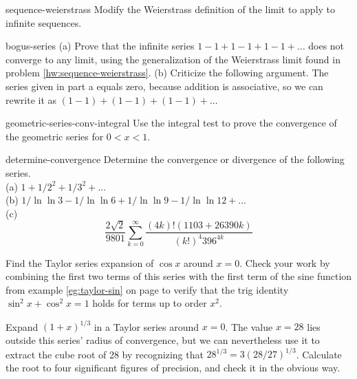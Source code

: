 \begin{hwsection}
\begin{hwwithsoln}{sequence-weierstrass}
Modify the Weierstrass definition of the limit to apply to infinite sequences.
\end{hwwithsoln}

\begin{hwwithsoln}{bogus-series}
(a) Prove that the infinite series $1-1+1-1+1-1+\ldots$ does not converge to any limit, using the generalization
of the Weierstrass limit found in problem \ref{hw:sequence-weierstrass}.
(b) Criticize the following argument. The series given in part a equals zero, because addition is associative, so we can
rewrite it as $(1-1)+(1-1)+(1-1)+\ldots$
\end{hwwithsoln}

\begin{hwwithsoln}{geometric-series-conv-integral}
Use the integral test to prove the convergence of the geometric series for $0<x<1$.
\end{hwwithsoln}

\begin{hwwithsoln}{determine-convergence}
Determine the convergence or divergence of the following series.\\
(a) $1+1/2^2+1/3^2+\ldots$\\
(b) $1/\ln\ln 3-1/\ln\ln 6+1/\ln \ln 9-1/\ln\ln 12+\ldots$\\
(c)
\begin{equation*}
\frac{2\sqrt{2}}{9801} \sum^\infty_{k=0} \frac{(4k)!(1103+26390k)}{(k!)^4 396^{4k}}
\end{equation*}
\end{hwwithsoln}

\begin{hw}
Find the Taylor series expansion of $\cos x$ around $x=0$. Check your work by combining the first two
terms of this series with the first term of the sine function from example \ref{eg:taylor-sin}
on page \pageref{eg:taylor-sin} to verify that the trig identity $\sin^2 x+\cos^2 x=1$ holds
for terms up to order $x^2$.
\end{hw}

\begin{hw}
Expand $(1+x)^{1/3}$ in a Taylor series around $x=0$. The value $x=28$ lies outside
this series' radius of convergence, but we can nevertheless use it to
extract the cube root of 28 by recognizing that $28^{1/3}=3(28/27)^{1/3}$.
Calculate the root to four significant figures of precision, and check it
in the obvious way.
\end{hw}


\end{hwsection}
